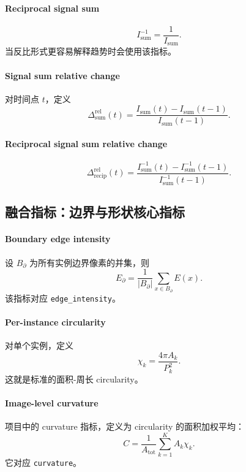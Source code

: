 \documentclass[11pt]{article}
\newcommand{\1}{\mathbf{1}}
\newcommand{\edgefield}{E}
\begin{document}
\paragraph{Reciprocal signal sum}
\begin{equation}
I_{\mathrm{sum}}^{-1} = \frac{1}{I_{\mathrm{sum}}}.
\end{equation}
当反比形式更容易解释趋势时会使用该指标。

\paragraph{Signal sum relative change}
对时间点 $t$，定义
\begin{equation}
\Delta_{\mathrm{sum}}^{\mathrm{rel}}(t) = \frac{I_{\mathrm{sum}}(t)-I_{\mathrm{sum}}(t-1)}{I_{\mathrm{sum}}(t-1)}.
\end{equation}

\paragraph{Reciprocal signal sum relative change}
\begin{equation}
\Delta_{\mathrm{recip}}^{\mathrm{rel}}(t) = \frac{I_{\mathrm{sum}}^{-1}(t)-I_{\mathrm{sum}}^{-1}(t-1)}{I_{\mathrm{sum}}^{-1}(t-1)}.
\end{equation}

\subsection{融合指标：边界与形状核心指标}
\paragraph{Boundary edge intensity}
设 $B_{\partial}$ 为所有实例边界像素的并集，则
\begin{equation}
E_{\partial} = \frac{1}{|B_{\partial}|}\sum_{x\in B_{\partial}} \edgefield(x).
\end{equation}
该指标对应 \texttt{edge\_intensity}。

\paragraph{Per-instance circularity}
对单个实例，定义
\begin{equation}
\chi_k = \frac{4\pi A_k}{P_k^2}.
\end{equation}
这就是标准的面积-周长 circularity。

\paragraph{Image-level curvature}
项目中的 curvature 指标，定义为 circularity 的面积加权平均：
\begin{equation}
C = \frac{1}{A_{\mathrm{tot}}}\sum_{k=1}^{K} A_k\chi_k.
\end{equation}
它对应 \texttt{curvature}。
\end{document}
